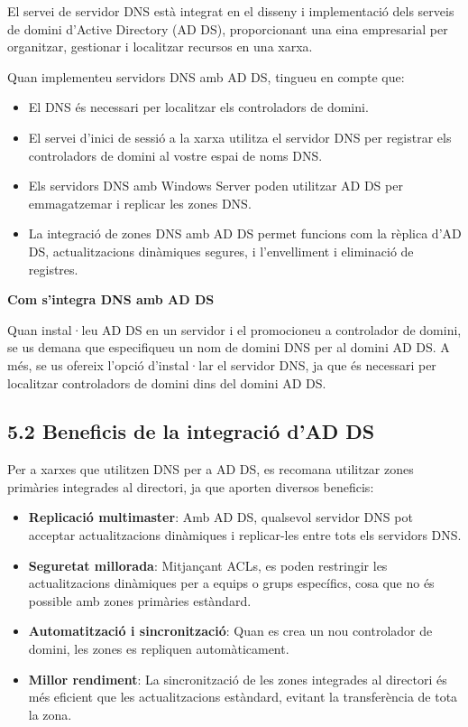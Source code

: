 \documentclass[
  a4paper,
]{article}
\providecommand{\tightlist}{%
  \setlength{\itemsep}{0pt}\setlength{\parskip}{0pt}}
\begin{document}
El servei de servidor DNS està integrat en el disseny i implementació
dels serveis de domini d'Active Directory (AD DS), proporcionant una
eina empresarial per organitzar, gestionar i localitzar recursos en una
xarxa.

Quan implementeu servidors DNS amb AD DS, tingueu en compte que:

\begin{itemize}
\tightlist
\item
  El DNS és necessari per localitzar els controladors de domini.
\item
  El servei d'inici de sessió a la xarxa utilitza el servidor DNS per
  registrar els controladors de domini al vostre espai de noms DNS.
\item
  Els servidors DNS amb Windows Server poden utilitzar AD DS per
  emmagatzemar i replicar les zones DNS.
\item
  La integració de zones DNS amb AD DS permet funcions com la rèplica
  d'AD DS, actualitzacions dinàmiques segures, i l'envelliment i
  eliminació de registres.
\end{itemize}

\textbf{Com s'integra DNS amb AD DS}

Quan instal·leu AD DS en un servidor i el promocioneu a controlador de
domini, se us demana que especifiqueu un nom de domini DNS per al domini
AD DS. A més, se us ofereix l'opció d'instal·lar el servidor DNS, ja que
és necessari per localitzar controladors de domini dins del domini AD
DS.

\subsection{5.2 Beneficis de la integració d'AD
DS}\label{beneficis-de-la-integraciuxf3-dad-ds}

Per a xarxes que utilitzen DNS per a AD DS, es recomana utilitzar zones
primàries integrades al directori, ja que aporten diversos beneficis:

\begin{itemize}
\tightlist
\item
  \textbf{Replicació multimaster}: Amb AD DS, qualsevol servidor DNS pot
  acceptar actualitzacions dinàmiques i replicar-les entre tots els
  servidors DNS.
\item
  \textbf{Seguretat millorada}: Mitjançant ACLs, es poden restringir les
  actualitzacions dinàmiques per a equips o grups específics, cosa que
  no és possible amb zones primàries estàndard.
\item
  \textbf{Automatització i sincronització}: Quan es crea un nou
  controlador de domini, les zones es repliquen automàticament.
\item
  \textbf{Millor rendiment}: La sincronització de les zones integrades
  al directori és més eficient que les actualitzacions estàndard,
  evitant la transferència de tota la zona.
\end{itemize}
\end{document}
